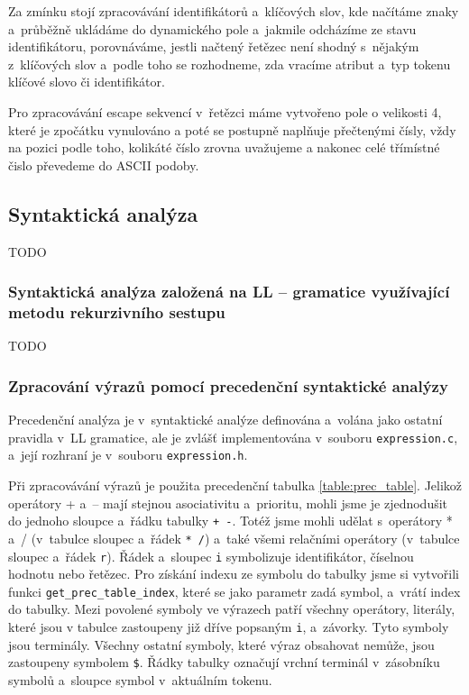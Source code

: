 \documentclass[a4paper, 11pt]{article}
\begin{document}
	Za zmínku stojí zpracovávání identifikátorů a~klíčových slov, kde načítáme znaky a~průběžně ukládáme do dynamického pole 
	a~jakmile odcházíme ze stavu identifikátoru, porovnáváme, jestli načtený řetězec není shodný s~nějakým z~klíčových slov a~podle 
	toho se rozhodneme, zda vracíme atribut a~typ tokenu klíčové slovo či identifikátor. 
	
	Pro zpracovávání escape sekvencí v~řetězci máme vytvořeno pole o velikosti 4, které je zpočátku vynulováno a poté se postupně 
	naplňuje přečtenými čísly, vždy na pozici podle toho, kolikáté číslo zrovna uvažujeme a nakonec celé třímístné čislo převedeme 
	do ASCII podoby.


	\subsection{Syntaktická analýza}

	TODO

	\subsubsection{Syntaktická analýza založená na LL -- gramatice využívající metodu rekurzivního sestupu}

	TODO

	\subsubsection{Zpracování výrazů pomocí precedenční syntaktické analýzy}

	Precedenční analýza je v~syntaktické analýze definována a~volána jako ostatní pravidla v~LL gramatice,
	ale je zvlášť implementována v~souboru \texttt{expression.c}, a~její rozhraní je v~souboru \texttt{expression.h}.

	Při zpracovávání výrazů je použita precedenční tabulka \ref{table:prec_table}. Jelikož operátory + a~– mají
	stejnou asociativitu a~prioritu, mohli jsme je zjednodušit do jednoho sloupce a~řádku tabulky \texttt{+ -}.
	Totéž jsme mohli udělat s~operátory * a~/ (v~tabulce sloupec a~řádek \texttt{* /}) a~také všemi relačními operátory
	(v~tabulce sloupec a~řádek \texttt{r}). Řádek a~sloupec \texttt{i} symbolizuje identifikátor, číselnou hodnotu
	nebo řetězec. Pro získání indexu ze symbolu do tabulky jsme si vytvořili funkci \texttt{get\_prec\_table\_index},
	které se jako parametr zadá symbol, a~vrátí index do tabulky. Mezi povolené symboly ve výrazech patří všechny
	operátory, literály, které jsou v tabulce zastoupeny již dříve popsaným \texttt{i}, a~závorky. Tyto symboly jsou
	terminály. Všechny ostatní symboly, které výraz obsahovat nemůže, jsou zastoupeny symbolem \texttt{\$}. Řádky
	tabulky označují vrchní terminál v~zásobníku symbolů a~sloupce symbol v~aktuálním tokenu.
\end{document}
